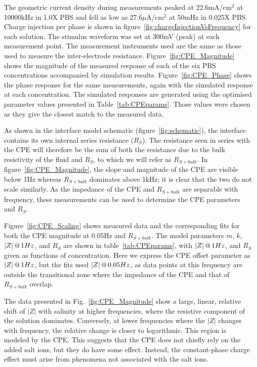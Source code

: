 \documentclass[journal, a4paper]{IEEEtran}
\begin{document}
The geometric current density during measurements peaked at 22.6\thinspace mA/cm$^{2}$ at 10000\thinspace kHz in 1.0X PBS and fell as low as 27.6\thinspace $\mu$A/cm$^{2}$ at 50\thinspace mHz in 0.025X PBS. Charge injection per phase is shown in figure~\ref{fig:chargeInjectionVsFrequency} for each solution.
The stimulus waveform was set at 300\thinspace mV (peak) at each measurement point. The measurement instruments used are the same as those used to measure the inter-electrode resistance.
Figure~\ref{fig:CPE_Magnitude} shows the magnitude of the measured response of each of the six PBS concentrations accompanied by simulation results. Figure~\ref{fig:CPE_Phase} shows the phase response for the same measurements, again with the simulated response at each concentration. The simulated responses are generated using the optimised parameter values presented in Table~\ref{tab:CPEparams}. Those values were chosen as they give the closest match to the measured data.

As shown in the interface model schematic (figure~\ref{fig:schematic}), the interface contains its own internal series resistance ($R_{S}$). The resistance seen in series with the CPE will therefore be the sum of both the resistance due to the bulk resistivity of the fluid and $R_{S}$, to which we will refer as $R_{S+bulk}$.
In figure~\ref{fig:CPE_Magnitude}, the slope and magnitude of the CPE are visible below 1\thinspace Hz whereas $R_{S+bulk}$  dominates above 1\thinspace kHz; it is clear that the two do not scale similarly.
As the impedance of the CPE and $R_{S+bulk}$ are separable with frequency, these measurements can be used to determine the CPE parameters and $R_{S}$.

Figure~\ref{fig:CPE_Scaling} shows measured data and the corresponding fits for both the CPE magnitude at 0.05\thinspace Hz and $R_{S+bulk}$. The model parameters $m$, $k$, $|Z|\thinspace @\thinspace 1Hz$, and $R_S$ are shown in table~\ref{tab:CPEparams}, with $|Z|\thinspace @\thinspace 1Hz$, and $R_S$ given as functions of concentration.
Here we express the CPE offset parameter as $|Z|\thinspace @ \thinspace 1Hz$, but the fits used $|Z|\thinspace @ \thinspace 0.05Hz$, as data points at this frequency are outside the transitional zone where the impedance of the CPE and that of $R_{S+bulk}$ overlap.

The data presented in Fig.~\ref{fig:CPE_Magnitude} show a large, linear, relative shift of $|Z|$ with salinity at higher frequencies, where the resistive component of the solution dominates.
Conversely, at lower frequencies where the $|Z|$ changes with frequency, the relative change is closer to logarithmic. This region is modeled by the CPE.
This suggests that the CPE does not chiefly rely on the added salt ions, but they do have some effect.
Instead, the constant-phase charge effect must arise from phenomena not associated with the salt ions.
\end{document}
